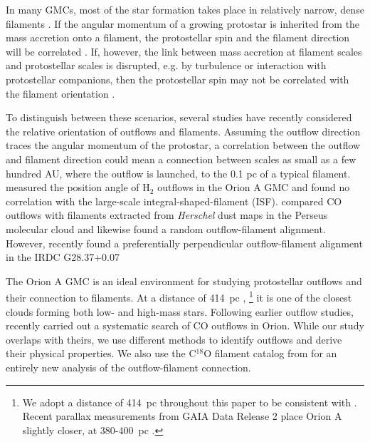 \documentclass[twocolumn]{aastex63}
\begin{document}
In many GMCs, most of the star formation takes place in relatively narrow, dense filaments \citep{Arzoumanian11,Suri19}. If the angular momentum of a growing protostar is inherited from the mass accretion onto a filament, the protostellar spin and the filament direction will be correlated \citep{Bodenheimer95,Andre14,Li19}. If, however, the link between mass accretion at filament scales and protostellar scales is disrupted, e.g. by turbulence or interaction with protostellar companions, then the protostellar spin may not be correlated with the filament orientation \citep{Offner16,Lee17}.


To distinguish between these scenarios, several studies have recently considered the relative orientation of outflows and filaments. Assuming the outflow direction traces the angular momentum of the protostar, a correlation between the outflow and filament direction could mean a connection between scales as small as a few hundred AU, where the outflow is launched, to the 0.1 pc of a typical filament. \citet{Davis09} measured the position angle of H$_2$ outflows in the Orion A GMC and found no correlation with the large-scale integral-shaped-filament (ISF). \citet{Stephens17} compared CO outflows with filaments extracted from \emph{Herschel} dust maps in the Perseus molecular cloud and likewise found a random outflow-filament alignment. However, \citet{Kong19} recently found a preferentially perpendicular outflow-filament alignment in the IRDC G28.37+0.07

The Orion A GMC is an ideal environment for studying protostellar outflows and their connection to filaments. At a distance of 414~pc \citep{Menten07}, \footnote{We adopt a distance of 414~pc throughout this paper to be consistent with \citet{Tanabe:submitted}. Recent parallax measurements from GAIA Data Release 2 place Orion A slightly closer, at 380-400~pc \citep{Kounkel18,Grossschedl18,Kuhn19}.} it is one of the closest clouds forming both low- and high-mass stars. Following earlier outflow studies, \citet{Tanabe:submitted} recently carried out a systematic search of CO outflows in Orion. While our study overlaps with theirs, we use different methods to identify outflows and derive their physical properties. We also use the C$^{18}$O filament catalog from \citet{Suri19} for an entirely new analysis of the outflow-filament connection.
\end{document}

